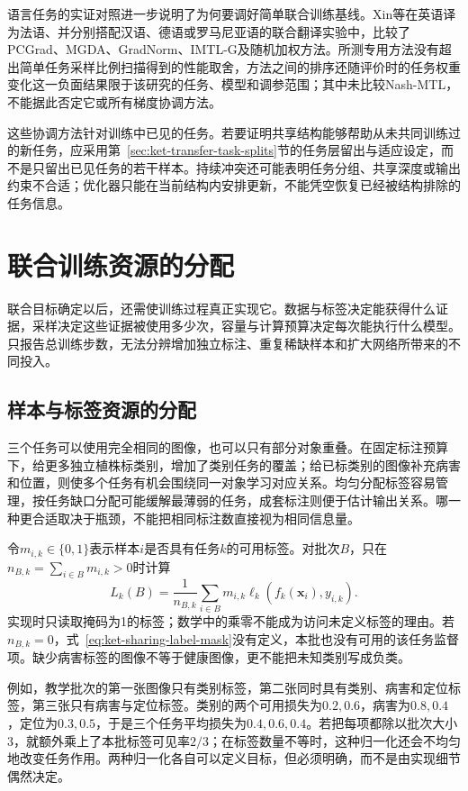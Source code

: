 语言任务的实证对照进一步说明了为何要调好简单联合训练基线。Xin等在英语译为法语、并分别搭配汉语、德语或罗马尼亚语的联合翻译实验中，比较了PCGrad、MGDA、GradNorm、IMTL-G及随机加权方法。所测专用方法没有超出简单任务采样比例扫描得到的性能取舍，方法之间的排序还随评价时的任务权重变化这一负面结果限于该研究的任务、模型和调参范围；其中未比较Nash-MTL，不能据此否定它或所有梯度协调方法。

这些协调方法针对训练中已见的任务。若要证明共享结构能够帮助从未共同训练过的新任务，应采用第~\ref{sec:ket-transfer-task-splits}节的任务层留出与适应设定，而不是只留出已见任务的若干样本。持续冲突还可能表明任务分组、共享深度或输出约束不合适；优化器只能在当前结构内安排更新，不能凭空恢复已经被结构排除的任务信息。

\section{联合训练资源的分配}
\label{sec:ket-sharing-resources}

联合目标确定以后，还需使训练过程真正实现它。数据与标签决定能获得什么证据，采样决定这些证据被使用多少次，容量与计算预算决定每次能执行什么模型。只报告总训练步数，无法分辨增加独立标注、重复稀缺样本和扩大网络所带来的不同投入。

\subsection{样本与标签资源的分配}
\label{sec:ket-sharing-labels}

三个任务可以使用完全相同的图像，也可以只有部分对象重叠。在固定标注预算下，给更多独立植株标类别，增加了类别任务的覆盖；给已标类别的图像补充病害和位置，则使多个任务有机会围绕同一对象学习对应关系。均匀分配标签容易管理，按任务缺口分配可能缓解最薄弱的任务，成套标注则便于估计输出关系。哪一种更合适取决于瓶颈，不能把相同标注数直接视为相同信息量。

令$m_{i,k}\in\{0,1\}$表示样本$i$是否具有任务$k$的可用标签。对批次$B$，只在$n_{B,k}=\sum_{i\in B}m_{i,k}>0$时计算
\begin{equation}
  L_k(B)=
  \frac{1}{n_{B,k}}
  \sum_{i\in B}m_{i,k}
  \ell_k(f_k(\bm x_i),y_{i,k}).
  \label{eq:ket-sharing-label-mask}
\end{equation}
实现时只读取掩码为1的标签；数学中的乘零不能成为访问未定义标签的理由。若$n_{B,k}=0$，式~\eqref{eq:ket-sharing-label-mask}没有定义，本批也没有可用的该任务监督项。缺少病害标签的图像不等于健康图像，更不能把未知类别写成负类。

例如，教学批次的第一张图像只有类别标签，第二张同时具有类别、病害和定位标签，第三张只有病害与定位标签。类别的两个可用损失为$0.2,0.6$，病害为$0.8,0.4$，定位为$0.3,0.5$，于是三个任务平均损失为$0.4,0.6,0.4$。若把每项都除以批次大小3，就额外乘上了本批标签可见率$2/3$；在标签数量不等时，这种归一化还会不均匀地改变任务作用。两种归一化各自可以定义目标，但必须明确，而不是由实现细节偶然决定。

